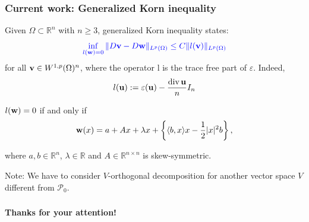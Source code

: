 \documentclass[small,xcolor=svgnames]{beamer}
\def\di{\mbox{\rm div\,}}
\def\O{\Omega}
\def\R{{\mathbb R}}
\def\uu{{\bf u}}
\def\vv{{\bf v}}
\def\ww{{\bf w}}
\def\P{\mathcal{P}}
\def\c{\color{blue}}
\begin{document}
\begin{frame}\frametitle{Current work: Generalized Korn inequality}

Given $\O\subset\R^n$ with $n\geq 3$,  generalized Korn inequality states:
\[{\c\inf_{l(\ww)=0}\|D\vv-D\ww\|_{L^p(\O)}\leq C \|l(\vv)\|_{L^p(\O)}}\] 
for all $\vv\in W^{1,p}(\O)^n$, where the operator l is the trace free part of $\varepsilon$. Indeed, 
\[l(\uu):=\varepsilon(\uu)-\frac{\di\uu}{n} I_n\]

$l(\ww)=0$ if and only if 
\begin{eqnarray*}
\ww(x)=a+Ax+\lambda x+\left\{\langle b,x\rangle x-\frac{1}{2}|x|^2b\right\},
\end{eqnarray*}

where $a,b\in\R^n$, $\lambda\in\R$ and $A\in\R^{n\times n}$ is skew-symmetric.

\bigskip

Note: We have to consider $V$-orthogonal decomposition for another vector space $V$ different from $\P_0$.

\end{frame}







\begin{frame}\frametitle{}


\begin{center}
\textbf{\Large Thanks for your attention!}
\end{center}
\end{frame}
\end{document}
